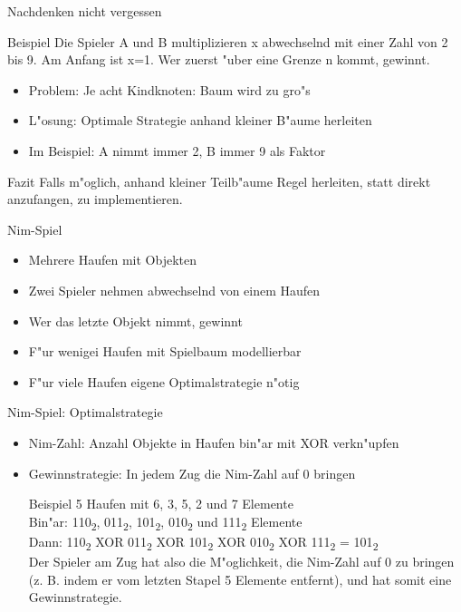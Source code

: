 \documentclass[18pt]{beamer}
\begin{document}
\begin{frame}{Nachdenken nicht vergessen}
\begin{block}{Beispiel}
Die Spieler A und B multiplizieren x abwechselnd mit einer Zahl von 2 bis 9. Am Anfang ist x=1. Wer zuerst "uber eine Grenze n kommt, gewinnt.
\end{block}
\pause
\begin{itemize}
\item Problem: Je acht Kindknoten: Baum wird zu gro"s
\item L"osung: Optimale Strategie anhand kleiner B"aume herleiten
\item Im Beispiel: A nimmt immer 2, B immer 9 als Faktor
\end{itemize}
\pause
\begin{block}{Fazit}
Falls m"oglich, anhand kleiner Teilb"aume Regel herleiten, statt direkt anzufangen, zu implementieren.
\end{block}
\end{frame}

\begin{frame}{Nim-Spiel}
\begin{itemize}
\item Mehrere Haufen mit Objekten
\item Zwei Spieler nehmen abwechselnd von einem Haufen
\item Wer das letzte Objekt nimmt, gewinnt
\item F"ur wenigei Haufen mit Spielbaum modellierbar
\item F"ur viele Haufen eigene Optimalstrategie n"otig
\end{itemize}
\end{frame}

\begin{frame}{Nim-Spiel: Optimalstrategie}
\begin{itemize}
\item Nim-Zahl: Anzahl Objekte in Haufen bin"ar mit XOR verkn"upfen
\item Gewinnstrategie: In jedem Zug die Nim-Zahl auf 0 bringen
\begin{block}{Beispiel}
5 Haufen mit 6, 3, 5, 2 und 7 Elemente \\
Bin"ar: 110\textsubscript{2}, 011\textsubscript{2}, 101\textsubscript{2}, 010\textsubscript{2} und 111\textsubscript{2} Elemente\\
Dann: 110\textsubscript{2} XOR 011\textsubscript{2} XOR 101\textsubscript{2} XOR 010\textsubscript{2} XOR 111\textsubscript{2} = 101\textsubscript{2} \\
Der Spieler am Zug hat also die M"oglichkeit, die Nim-Zahl auf 0 zu bringen (z. B. indem er vom letzten Stapel 5 Elemente entfernt), und hat somit eine Gewinnstrategie.
\end{block}
\end{itemize}
\end{frame}
\end{document}
